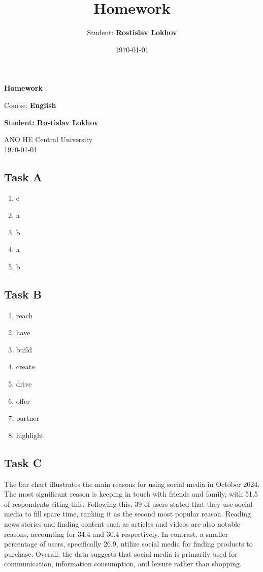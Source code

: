 \documentclass[a4paper,12pt,english]{article}
\title{Homework}
\author{Student: \textbf{Rostislav Lokhov}}
\date{\today}
\begin{document}
\begin{titlepage}
    \centering
    \vspace*{1cm}

    \Huge
    \textbf{Homework}

    \vspace{0.5cm}
    \LARGE
    Course: \textbf{English}

    \vspace{1.5cm}

    \textbf{Student: Rostislav Lokhov}

    \vfill

    \Large
    ANO HE Central University\\
    \vspace{0.3cm}
    \today

\end{titlepage}


\subsection{Task A}
\begin{enumerate}
    \item c
    \item a
    \item b
    \item a
    \item b
\end{enumerate}

\subsection{Task B}

\begin{enumerate}
    \item reach
    \item have
    \item build
    \item create
    \item drive
    \item offer
    \item partner
    \item highlight
\end{enumerate}

\subsection{Task C}
The bar chart illustrates the main reasons for using social media in October 2024. The most significant reason is keeping in touch with friends and family, with 51.5 of respondents citing this.  Following this, 39 of users stated that they use social media to fill spare time, ranking it as the second most popular reason.  Reading news stories and finding content such as articles and videos are also notable reasons, accounting for 34.4 and 30.4 respectively.  In contrast, a smaller percentage of users, specifically 26.9, utilize social media for finding products to purchase. Overall, the data suggests that social media is primarily used for communication, information consumption, and leisure rather than shopping.
\end{document}
